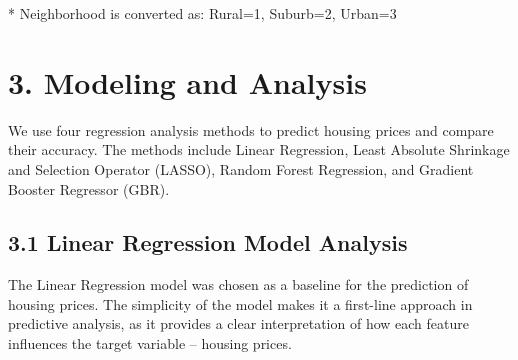 \documentclass[12pt, letterpaper]{report}
\begin{document}
\vspace{0.25cm}
* Neighborhood is converted as: Rural=1, Suburb=2, Urban=3
\section*{3. Modeling and Analysis}

We use four regression analysis methods to predict housing prices and compare their accuracy. The methods include Linear Regression, Least Absolute Shrinkage and Selection Operator (LASSO), Random Forest Regression, and Gradient Booster Regressor (GBR). 

\subsection*{3.1 Linear Regression Model Analysis}

The Linear Regression model was chosen as a baseline for the prediction of housing prices. The simplicity of the model makes it a first-line approach in predictive analysis, as it provides a clear interpretation of how each feature influences the target variable – housing prices.

\begin{table}[h]
\centering
{}
\caption{Linear Regression model performance}
\end{table}


\end{document}
